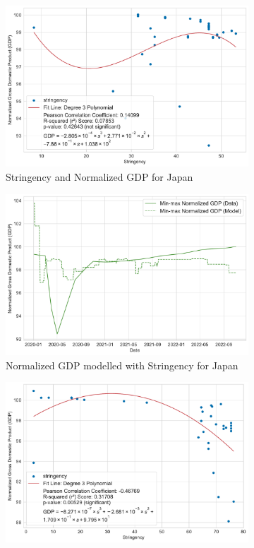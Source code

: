 \documentclass[tikz,fleqn,12pt]{wlscirep}
\begin{document}
\begin{figure}[htbp!]
\begin{subfigure}[t]{0.48\textwidth}
    \includegraphics[width=\linewidth]{images/stringency_vs_gdp_JPN.pdf}
    \caption{Stringency and Normalized GDP for Japan}
    \label{fig:stringency_vs_gdp_JPN}
  \end{subfigure}
  \hfill
  \begin{subfigure}[t]{0.48\textwidth}
    \centering
    \includegraphics[width=\linewidth]{images/gdp_modelled_with_stringency_JPN.pdf}
    \caption{Normalized GDP modelled with Stringency for Japan}
    \label{fig:gdp_modelled_with_stringency_JPN}
  \end{subfigure}
  \begin{subfigure}[t]{0.48\textwidth}
    \centering
    \includegraphics[width=\linewidth]{images/stringency_vs_gdp_CAN.pdf}

\end{subfigure}
\end{figure}
\end{document}
